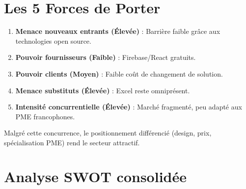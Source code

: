 \section{Les 5 Forces de Porter}

\begin{enumerate}
    \item \textbf{Menace nouveaux entrants (Élevée)} : Barrière faible grâce aux technologies open source.
    \item \textbf{Pouvoir fournisseurs (Faible)} : Firebase/React gratuits.
    \item \textbf{Pouvoir clients (Moyen)} : Faible coût de changement de solution.
    \item \textbf{Menace substituts (Élevée)} : Excel reste omniprésent.
    \item \textbf{Intensité concurrentielle (Élevée)} : Marché fragmenté, peu adapté aux PME francophones.
\end{enumerate}

Malgré cette concurrence, le positionnement différencié (design, prix, spécialisation PME) rend le secteur attractif.

\section{Analyse SWOT consolidée}

